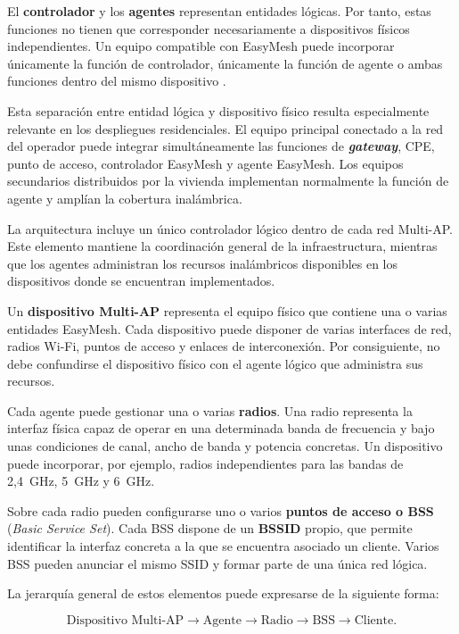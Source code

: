 El \textbf{controlador} y los \textbf{agentes} representan entidades
lógicas. Por tanto, estas funciones no tienen que corresponder
necesariamente a dispositivos físicos independientes. Un equipo
compatible con EasyMesh puede incorporar únicamente la función de
controlador, únicamente la función de agente o ambas funciones dentro del
mismo dispositivo \cite{wifi_alliance_easymesh}.

Esta separación entre entidad lógica y dispositivo físico resulta
especialmente relevante en los despliegues residenciales. El equipo
principal conectado a la red del operador puede integrar simultáneamente
las funciones de \textbf{\textit{gateway}}, CPE, punto de acceso,
controlador EasyMesh y agente EasyMesh. Los equipos secundarios
distribuidos por la vivienda implementan normalmente la función de
agente y amplían la cobertura inalámbrica.

La arquitectura incluye un único controlador lógico dentro de cada red
Multi-AP. Este elemento mantiene la coordinación general de la
infraestructura, mientras que los agentes administran los recursos
inalámbricos disponibles en los dispositivos donde se encuentran
implementados.

Un \textbf{dispositivo Multi-AP} representa el equipo físico que contiene
una o varias entidades EasyMesh. Cada dispositivo puede disponer de
varias interfaces de red, radios Wi-Fi, puntos de acceso y enlaces de
interconexión. Por consiguiente, no debe confundirse el dispositivo
físico con el agente lógico que administra sus recursos.

Cada agente puede gestionar una o varias \textbf{radios}. Una radio
representa la interfaz física capaz de operar en una determinada banda
de frecuencia y bajo unas condiciones de canal, ancho de banda y potencia
concretas. Un dispositivo puede incorporar, por ejemplo, radios
independientes para las bandas de 2,4~GHz, 5~GHz y 6~GHz.

Sobre cada radio pueden configurarse uno o varios
\textbf{puntos de acceso o BSS}
(\textit{Basic Service Set}). Cada BSS dispone de un
\textbf{BSSID} propio, que permite identificar la interfaz concreta a la
que se encuentra asociado un cliente. Varios BSS pueden anunciar el mismo
SSID y formar parte de una única red lógica.

La jerarquía general de estos elementos puede expresarse de la siguiente
forma:

\[
    \text{Dispositivo Multi-AP}
    \longrightarrow
    \text{Agente}
    \longrightarrow
    \text{Radio}
    \longrightarrow
    \text{BSS}
    \longrightarrow
    \text{Cliente}.
\]

